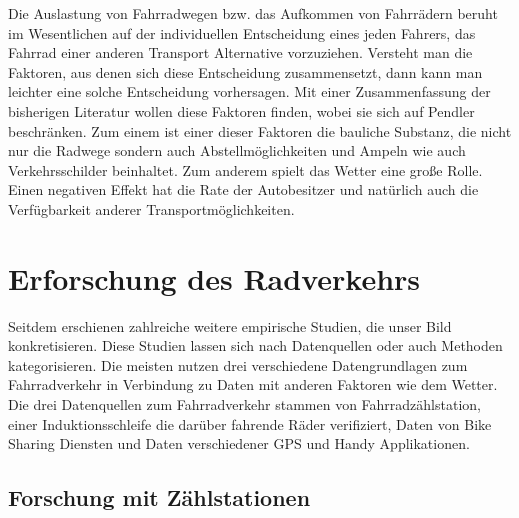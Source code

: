 \documentclass[a4paper,12pt]{thesis}
\begin{document}
Die Auslastung von Fahrradwegen bzw. das Aufkommen von Fahrrädern beruht im Wesentlichen auf der individuellen Entscheidung eines jeden Fahrers, das Fahrrad einer anderen Transport Alternative vorzuziehen. Versteht man die Faktoren, aus denen sich diese Entscheidung zusammensetzt, dann kann man leichter eine solche Entscheidung vorhersagen. Mit einer Zusammenfassung der bisherigen Literatur wollen \cite{Heinen2010} diese Faktoren finden, wobei sie sich auf Pendler beschränken. Zum einem ist einer dieser Faktoren die bauliche Substanz, die nicht nur die Radwege sondern auch Abstellmöglichkeiten und Ampeln wie auch Verkehrsschilder beinhaltet. Zum anderem spielt das Wetter eine große Rolle. Einen negativen Effekt hat die Rate der Autobesitzer und natürlich auch die Verfügbarkeit anderer Transportmöglichkeiten.\\

\section{Erforschung des Radverkehrs}

Seitdem erschienen zahlreiche weitere empirische Studien, die unser Bild konkretisieren. Diese Studien lassen sich nach Datenquellen oder auch Methoden kategorisieren. Die meisten nutzen drei verschiedene Datengrundlagen zum Fahrradverkehr in Verbindung zu Daten mit anderen Faktoren wie dem Wetter. Die drei Datenquellen zum Fahrradverkehr stammen von Fahrradzählstation, einer Induktionsschleife die darüber fahrende Räder verifiziert, Daten von Bike Sharing Diensten und Daten verschiedener GPS und Handy Applikationen.\\

\subsection{Forschung mit Zählstationen}
\end{document}

